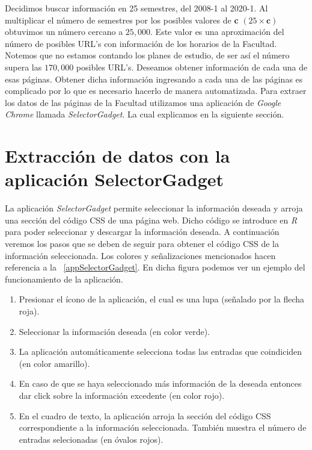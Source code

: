 \dfNmatrizChica %

Decidimos buscar información en 25 semestres, del 2008-1 al 2020-1. Al multiplicar el número de semestres por los posibles valores de \textbf{c} $(25 \times \textbf{c})$ obtuvimos un número cercano a $25,000$. Este valor es una aproximación del número de posibles URL's con información de los horarios de la Facultad. Notemos que no estamos contando los planes de estudio, de ser así el número supera las $170,000$ posibles URL's. Deseamos obtener información de cada una de esas páginas. Obtener dicha información ingresando a cada una de las páginas es complicado por lo que es necesario hacerlo de manera automatizada. Para extraer los datos de las páginas de la Facultad utilizamos una aplicación de \textit{Google Chrome} llamada \textit{SelectorGadget}. La cual explicamos en la siguiente sección.

\section{Extracción de datos con la aplicación SelectorGadget} \label{sec_ED_SelectorGadget}

La aplicación \textit{SelectorGadget} permite seleccionar la información deseada y arroja una sección del código CSS de una página web. Dicho código se introduce en \textit{R} para poder seleccionar y descargar la información deseada. A continuación veremos los pasos que se deben de seguir para obtener el código CSS de la información seleccionada. Los colores y señalizaciones mencionados hacen referencia a la \figurename{~\ref{appSelectorGadget}}. En dicha figura podemos ver un ejemplo del funcionamiento de la aplicación.

\begin{enumerate}
\item Presionar el ícono de la aplicación, el cual es una lupa (señalado por la flecha roja).

\item Seleccionar la información deseada (en color verde).

\item La aplicación automáticamente selecciona todas las entradas que coindiciden (en color amarillo).

\item En caso de que se haya seleccionado más información de la deseada entonces dar click sobre la información excedente (en color rojo).

\item  En el cuadro de texto, la aplicación arroja la sección del código CSS correspondiente a la información seleccionada. También muestra el número de entradas selecionadas (en óvalos rojos).
\end{enumerate}


